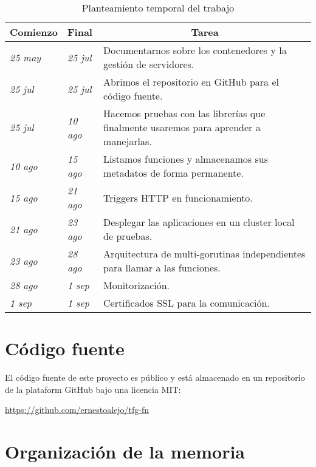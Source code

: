 {\renewcommand{\arraystretch}{1}%
\begin{table}[H]
\centering
\begin{tabularx}{\textwidth}{llX}
\textbf{Comienzo} & \textbf{Final}  & \multicolumn{1}{c}{\textbf{Tarea}}                                                    \\ \hline
\textit{25 may}   & \textit{25 jul} & Documentarnos sobre los contenedores y la gestión de servidores.                      \\
\textit{25 jul}   & \textit{25 jul} & Abrimos el repositorio en GitHub para el código fuente.                               \\
\textit{25 jul}   & \textit{10 ago} & Hacemos pruebas con las librerías que finalmente usaremos para aprender a manejarlas. \\
\textit{10 ago}   & \textit{15 ago} & Listamos funciones y almacenamos sus metadatos de forma permanente.                   \\
\textit{15 ago}   & \textit{21 ago} & Triggers HTTP en funcionamiento.                                                      \\
\textit{21 ago}   & \textit{23 ago} & Desplegar las aplicaciones en un cluster local de pruebas.                            \\
\textit{23 ago}   & \textit{28 ago} & Arquitectura de multi-gorutinas independientes para llamar a las funciones.           \\
\textit{28 ago}   & \textit{1 sep}  & Monitorización. \\
\textit{1 sep}   & \textit{1 sep}  & Certificados SSL para la comunicación. \\
\end{tabularx}
\caption{Planteamiento temporal del trabajo}
\label{table:time}
\end{table}

\section{Código fuente}

El código fuente de este proyecto es público y está almacenado en un repositorio de la plataform GitHub bajo una licencia MIT:

    \url{https://github.com/ernestoalejo/tfg-fn}

\section{Organización de la memoria}

}
